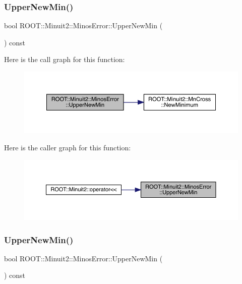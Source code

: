 \subsubsection{\texorpdfstring{UpperNewMin()}{UpperNewMin()}\hspace{0.1cm}{\footnotesize\ttfamily [1/2]}}
{\footnotesize\ttfamily bool R\+O\+O\+T\+::\+Minuit2\+::\+Minos\+Error\+::\+Upper\+New\+Min (\begin{DoxyParamCaption}{ }\end{DoxyParamCaption}) const\hspace{0.3cm}{\ttfamily [inline]}}

Here is the call graph for this function\+:
\nopagebreak
\begin{figure}[H]
\begin{center}
\leavevmode
\includegraphics[width=350pt]{d2/dd1/classROOT_1_1Minuit2_1_1MinosError_a5f37bb106903e148029b8461f9bbbe25_cgraph}
\end{center}
\end{figure}
Here is the caller graph for this function\+:\nopagebreak
\begin{figure}[H]
\begin{center}
\leavevmode
\includegraphics[width=350pt]{d2/dd1/classROOT_1_1Minuit2_1_1MinosError_a5f37bb106903e148029b8461f9bbbe25_icgraph}
\end{center}
\end{figure}
\mbox{\label{classROOT_1_1Minuit2_1_1MinosError_a5f37bb106903e148029b8461f9bbbe25}} 
\subsubsection{\texorpdfstring{UpperNewMin()}{UpperNewMin()}\hspace{0.1cm}{\footnotesize\ttfamily [2/2]}}
{\footnotesize\ttfamily bool R\+O\+O\+T\+::\+Minuit2\+::\+Minos\+Error\+::\+Upper\+New\+Min (\begin{DoxyParamCaption}{ }\end{DoxyParamCaption}) const\hspace{0.3cm}{\ttfamily [inline]}}

